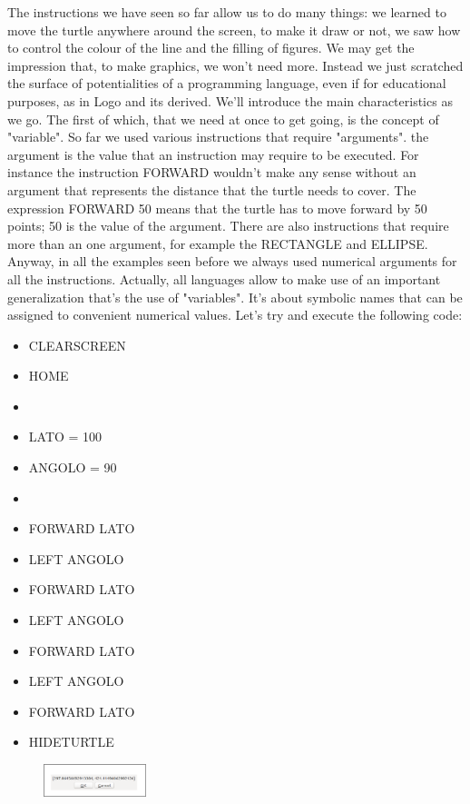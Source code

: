  
 The instructions we have seen so far allow us to do many things: we learned to move the turtle anywhere around the screen, to make it draw or not, we saw how to control the colour of the line and the filling of figures. We may get the impression that, to make graphics, we won't need more. Instead we just scratched the surface of potentialities of a programming language, even if for educational purposes, as in Logo and its derived.
 We'll introduce the main characteristics as we go. The first of which, that we need at once to get going, is the concept of "variable". So far we used various instructions that require "arguments". the argument is the value that an instruction may require to be executed. For instance the instruction FORWARD wouldn't make any sense without an argument that represents the distance that the turtle needs to cover. The expression FORWARD 50 means that the turtle has to move forward by 50 points; 50 is the value of the argument.
 There are also instructions that require more than an one argument, for example the RECTANGLE and ELLIPSE. 
 Anyway, in all the examples seen before we always used numerical arguments for all the instructions. Actually, all languages allow to make use of an important generalization that's the use of "variables". It’s about symbolic names that can be assigned to convenient numerical values. Let's try and execute the following code:
 

\vskip 1cm

\begin{scriptsize}
\begin{minipage}{0.40\textwidth}
\begin{itemize}[itemsep=-3pt,parsep=2pt]
\item[] CLEARSCREEN
\item[] HOME
\item[] 
\item[] LATO = 100
\item[] ANGOLO = 90
\item[] 
\item[] FORWARD LATO
\item[] LEFT ANGOLO
\item[] FORWARD LATO
\item[] LEFT ANGOLO
\item[] FORWARD LATO
\item[] LEFT ANGOLO
\item[] FORWARD LATO
\item[] HIDETURTLE    
\end{itemize}
\end{minipage}
\end{scriptsize}
\begin{minipage}{0.4\textwidth}
\begin{figure}[H]
   \includegraphics[width=3.0cm,trim=4 4 8 4,clip]{./images/disegnare/disegnare-28.png}
   \label{dis-27}
\end{figure}
\end{minipage} \hfill

